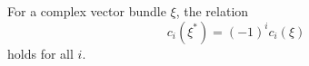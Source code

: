 For a complex vector bundle $\xi$, the relation
$$c_i(\xi^*) = (-1)^i c_i(\xi)$$
holds for all $i$.
